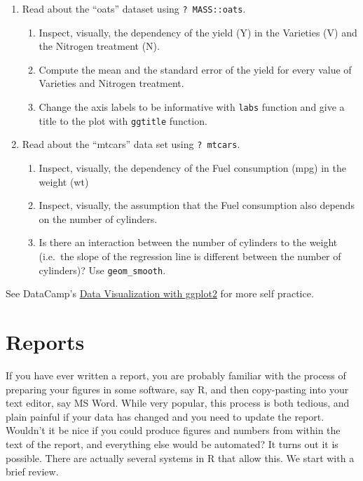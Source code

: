 \documentclass[]{book}
\providecommand{\tightlist}{%
  \setlength{\itemsep}{0pt}\setlength{\parskip}{0pt}}
\theoremstyle{definition}
\theoremstyle{definition}
\theoremstyle{definition}
\theoremstyle{remark}
\begin{document}
\begin{enumerate}
\def\labelenumi{\arabic{enumi}.}
\tightlist
\item
  Read about the ``oats'' dataset using \texttt{?\ MASS::oats}.

  \begin{enumerate}
  \def\labelenumii{\arabic{enumii}.}
  \tightlist
  \item
    Inspect, visually, the dependency of the yield (Y) in the Varieties
    (V) and the Nitrogen treatment (N).
  \item
    Compute the mean and the standard error of the yield for every value
    of Varieties and Nitrogen treatment.
  \item
    Change the axis labels to be informative with \texttt{labs} function
    and give a title to the plot with \texttt{ggtitle} function.
  \end{enumerate}
\item
  Read about the ``mtcars'' data set using \texttt{?\ mtcars}.

  \begin{enumerate}
  \def\labelenumii{\arabic{enumii}.}
  \tightlist
  \item
    Inspect, visually, the dependency of the Fuel consumption (mpg) in
    the weight (wt)
  \item
    Inspect, visually, the assumption that the Fuel consumption also
    depends on the number of cylinders.
  \item
    Is there an interaction between the number of cylinders to the
    weight (i.e.~the slope of the regression line is different between
    the number of cylinders)? Use \texttt{geom\_smooth}.
  \end{enumerate}
\end{enumerate}

See DataCamp's
\href{https://www.datacamp.com/courses/data-visualization-with-ggplot2-1}{Data
Visualization with ggplot2} for more self practice.

\chapter{Reports}\label{report}

If you have ever written a report, you are probably familiar with the
process of preparing your figures in some software, say R, and then
copy-pasting into your text editor, say MS Word. While very popular,
this process is both tedious, and plain painful if your data has changed
and you need to update the report. Wouldn't it be nice if you could
produce figures and numbers from within the text of the report, and
everything else would be automated? It turns out it is possible. There
are actually several systems in R that allow this. We start with a brief
review.
\end{document}
